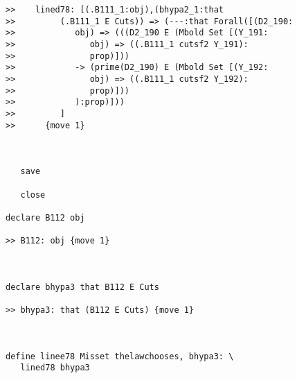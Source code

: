 \documentclass[12pt]{article}
\begin{document}
\begin{verbatim}
>>    lined78: [(.B111_1:obj),(bhypa2_1:that
>>         (.B111_1 E Cuts)) => (---:that Forall([(D2_190:
>>            obj) => (((D2_190 E (Mbold Set [(Y_191:
>>               obj) => ((.B111_1 cutsf2 Y_191):
>>               prop)]))
>>            -> (prime(D2_190) E (Mbold Set [(Y_192:
>>               obj) => ((.B111_1 cutsf2 Y_192):
>>               prop)]))
>>            ):prop)]))
>>         ]
>>      {move 1}



   save

   close

declare B112 obj

>> B112: obj {move 1}



declare bhypa3 that B112 E Cuts

>> bhypa3: that (B112 E Cuts) {move 1}



define linee78 Misset thelawchooses, bhypa3: \
   lined78 bhypa3


\end{verbatim}
\end{document}
